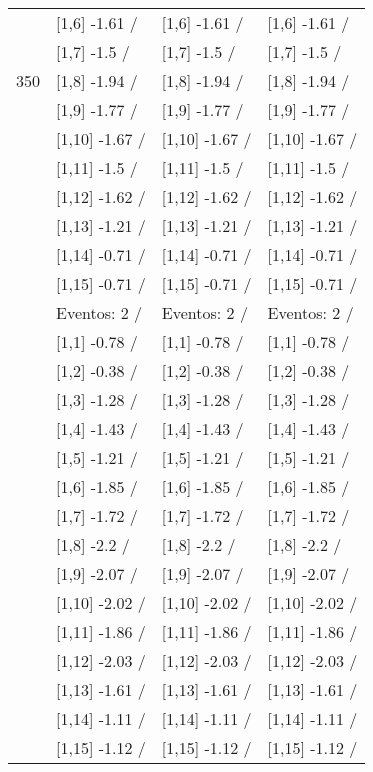 \begin{table}
\begin{tabular}[t]{llll}
 & {}[1,6] -1.61  / & {}[1,6] -1.61  / & {}[1,6] -1.61  /\\
 & {}[1,7] -1.5  / & {}[1,7] -1.5  / & {}[1,7] -1.5  /\\
350 & {}[1,8] -1.94  / & {}[1,8] -1.94  / & {}[1,8] -1.94  /\\
\addlinespace
 & {}[1,9] -1.77  / & {}[1,9] -1.77  / & {}[1,9] -1.77  /\\
 & {}[1,10] -1.67  / & {}[1,10] -1.67  / & {}[1,10] -1.67  /\\
 & {}[1,11] -1.5  / & {}[1,11] -1.5  / & {}[1,11] -1.5  /\\
 & {}[1,12] -1.62  / & {}[1,12] -1.62  / & {}[1,12] -1.62  /\\
 & {}[1,13] -1.21  / & {}[1,13] -1.21  / & {}[1,13] -1.21  /\\
\addlinespace
 & {}[1,14] -0.71  / & {}[1,14] -0.71  / & {}[1,14] -0.71  /\\
 & {}[1,15] -0.71  / & {}[1,15] -0.71  / & {}[1,15] -0.71  /\\
 & Eventos:  2 / & Eventos:  2 / & Eventos:  2 /\\
 & {}[1,1] -0.78  / & {}[1,1] -0.78  / & {}[1,1] -0.78  /\\
 & {}[1,2] -0.38  / & {}[1,2] -0.38  / & {}[1,2] -0.38  /\\
\addlinespace
 & {}[1,3] -1.28  / & {}[1,3] -1.28  / & {}[1,3] -1.28  /\\
 & {}[1,4] -1.43  / & {}[1,4] -1.43  / & {}[1,4] -1.43  /\\
 & {}[1,5] -1.21  / & {}[1,5] -1.21  / & {}[1,5] -1.21  /\\
 & {}[1,6] -1.85  / & {}[1,6] -1.85  / & {}[1,6] -1.85  /\\
 & {}[1,7] -1.72  / & {}[1,7] -1.72  / & {}[1,7] -1.72  /\\
\addlinespace
500 & {}[1,8] -2.2  / & {}[1,8] -2.2  / & {}[1,8] -2.2  /\\
 & {}[1,9] -2.07  / & {}[1,9] -2.07  / & {}[1,9] -2.07  /\\
 & {}[1,10] -2.02  / & {}[1,10] -2.02  / & {}[1,10] -2.02  /\\
 & {}[1,11] -1.86  / & {}[1,11] -1.86  / & {}[1,11] -1.86  /\\
 & {}[1,12] -2.03  / & {}[1,12] -2.03  / & {}[1,12] -2.03  /\\
\addlinespace
 & {}[1,13] -1.61  / & {}[1,13] -1.61  / & {}[1,13] -1.61  /\\
 & {}[1,14] -1.11  / & {}[1,14] -1.11  / & {}[1,14] -1.11  /\\
 & {}[1,15] -1.12  / & {}[1,15] -1.12  / & {}[1,15] -1.12  /\\
\bottomrule
\end{tabular}
\end{table}
